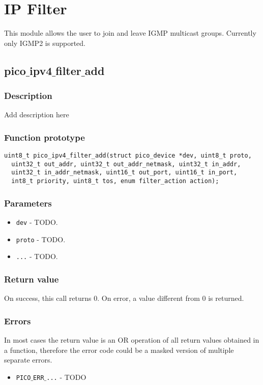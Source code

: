 \section{IP Filter}

This module allows the user to join and leave IGMP multicast groups. Currently only IGMP2 is supported.


\subsection{pico$\_$ipv4$\_$filter$\_$add}

\subsubsection*{Description}
Add description here

\subsubsection*{Function prototype}
\begin{verbatim}
uint8_t pico_ipv4_filter_add(struct pico_device *dev, uint8_t proto,
  uint32_t out_addr, uint32_t out_addr_netmask, uint32_t in_addr,
  uint32_t in_addr_netmask, uint16_t out_port, uint16_t in_port,
  int8_t priority, uint8_t tos, enum filter_action action);
\end{verbatim}

\subsubsection*{Parameters}
\begin{itemize}[noitemsep]
\item \texttt{dev} - TODO.
\item \texttt{proto} - TODO.
\item \texttt{...} - TODO.
\end{itemize}

\subsubsection*{Return value}
On success, this call returns 0.
On error, a value different from 0 is returned.

\subsubsection*{Errors}
In most cases the return value is an OR operation of all return values obtained in a function,
therefore the error code could be a masked version of multiple separate errors.

\begin{itemize}[noitemsep]
\item \texttt{PICO$\_$ERR$\_$...}          - TODO
\end{itemize}


